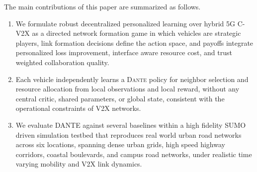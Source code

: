 The main contributions of this paper are summarized as follows.
\begin{enumerate}
\item We formulate robust decentralized personalized learning over hybrid 5G C-V2X as a directed network formation game in which vehicles are strategic players, link formation decisions define the action space, and payoffs integrate personalized loss improvement, interface aware resource cost, and trust weighted collaboration quality.
\item Each vehicle independently learns a \textsc{Dante} policy for neighbor selection and resource allocation from local observations and local reward, without any central critic, shared parameters, or global state, consistent with the operational constraints of V2X networks.
\item We evaluate DANTE against several baselines within a high fidelity SUMO driven simulation testbed that reproduces real world urban road networks across six locations, spanning dense urban grids, high speed highway corridors, coastal boulevards, and campus road networks, under realistic time varying mobility and V2X link dynamics.
\end{enumerate}
